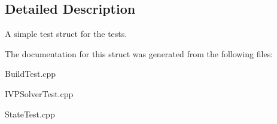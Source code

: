 \subsection{Detailed Description}
A simple test struct for the tests. 

The documentation for this struct was generated from the following files\+:\begin{DoxyCompactItemize}
\item 
Build\+Test.\+cpp\item 
I\+V\+P\+Solver\+Test.\+cpp\item 
State\+Test.\+cpp\end{DoxyCompactItemize}
